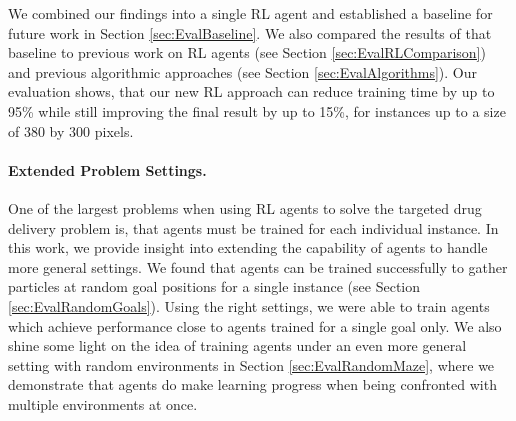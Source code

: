 We combined our findings into a single RL agent and established a baseline for future work in Section \ref{sec:EvalBaseline}. We also compared the results of that baseline to previous work on RL agents (see Section \ref{sec:EvalRLComparison}) and previous algorithmic approaches (see Section \ref{sec:EvalAlgorithms}). Our evaluation shows, that our new RL approach can reduce training time by up to 95\% while still improving the final result by up to 15\%, for instances up to a size of 380 by 300 pixels.


\paragraph{Extended Problem Settings.}
One of the largest problems when using RL agents to solve the targeted drug delivery problem is, that agents must be trained for each individual instance. In this work, we provide insight into extending the capability of agents to handle more general settings. We found that agents can be trained successfully to gather particles at random goal positions for a single instance (see Section \ref{sec:EvalRandomGoals}). Using the right settings, we were able to train agents which achieve performance close to agents trained for a single goal only. We also shine some light on the idea of training agents under an even more general setting with random environments in Section \ref{sec:EvalRandomMaze}, where we demonstrate that agents do make learning progress when being confronted with multiple environments at once. 

